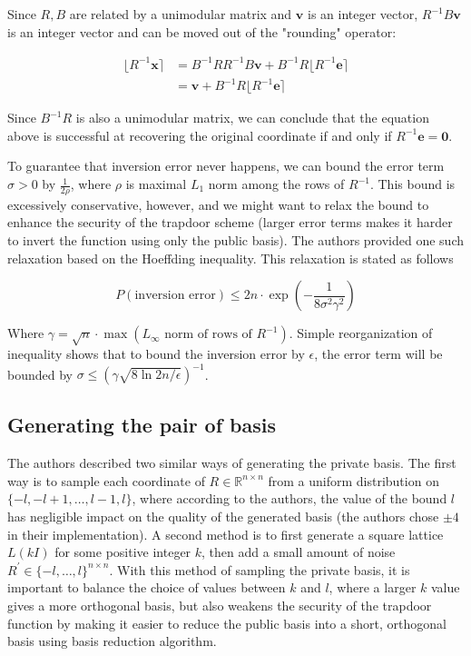 \documentclass[letterpaper,12pt]{article}
\begin{document}
Since $R, B$ are related by a unimodular matrix and $\mathbf{v}$ is an integer vector, $R^{-1}B\mathbf{v}$ is an integer vector and can be moved out of the "rounding" operator:

$$
\begin{aligned}
\lfloor R^{-1}\mathbf{x} \rceil &= B^{-1}RR^{-1}B\mathbf{v} + B^{-1}R\lfloor R^{-1}\mathbf{e}\rceil \\
&= \mathbf{v} + B^{-1}R\lfloor R^{-1}\mathbf{e} \rceil
\end{aligned}
$$

Since $B^{-1}R$ is also a unimodular matrix, we can conclude that the equation above is successful at recovering the original coordinate if and only if $R^{-1}\mathbf{e} = \mathbf{0}$.

To guarantee that inversion error never happens, we can bound the error term $\sigma > 0$ by $\frac{1}{2\rho}$, where $\rho$ is maximal $L_1$ norm among the rows of $R^{-1}$. This bound is excessively conservative, however, and we might want to relax the bound to enhance the security of the trapdoor scheme (larger error terms makes it harder to invert the function using only the public basis). The authors provided one such relaxation based on the Hoeffding inequality. This relaxation is stated as follows

$$
P(\text{inversion error}) \leq 2n \cdot \exp(-\frac{1}{8\sigma^2\gamma^2})
$$

Where $\gamma = \sqrt{n} \cdot \max(L_\infty \text{ norm of rows of } R^{-1})$. Simple reorganization of inequality shows that to bound the inversion error by $\epsilon$, the error term will be bounded by $\sigma \leq (\gamma\sqrt{8\ln{2n/\epsilon}})^{-1}$.

\subsection{Generating the pair of basis}
The authors described two similar ways of generating the private basis. The first way is to sample each coordinate of $R \in \mathbb{R}^{n \times n}$ from a uniform distribution on $\{-l, -l + 1, \ldots, l-1, l\}$, where according to the authors, the value of the bound $l$ has negligible impact on the quality of the generated basis (the authors chose $\pm 4$ in their implementation). A second method is to first generate a square lattice $L(kI)$ for some positive integer $k$, then add a small amount of noise $R^\prime \in \{-l, \ldots, l\}^{n \times n}$. With this method of sampling the private basis, it is important to balance the choice of values between $k$ and $l$, where a larger $k$ value gives a more orthogonal basis, but also weakens the security of the trapdoor function by making it easier to reduce the public basis into a short, orthogonal basis using basis reduction algorithm.
\end{document}
